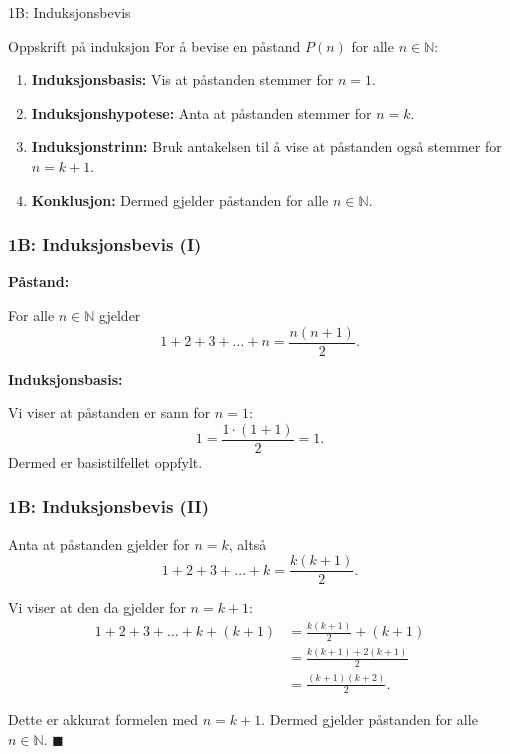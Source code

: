 \blueheader
\begin{frame}{1B: Induksjonsbevis}

\begin{blue*}{Oppskrift på induksjon}
For å bevise en påstand $P(n)$ for alle $n \in \mathbb{N}$:

\begin{enumerate}
    \item \textbf{Induksjonsbasis:} Vis at påstanden stemmer for $n=1$.
    \item \textbf{Induksjonshypotese:} Anta at påstanden stemmer for $n=k$.
    \item \textbf{Induksjonstrinn:} Bruk antakelsen til å vise at påstanden
          også stemmer for $n=k+1$.
    \item \textbf{Konklusjon:} Dermed gjelder påstanden for alle $n \in \mathbb{N}$.
\end{enumerate}

\end{blue*}

\end{frame}


\greenheader
\begin{frame}
\frametitle{1B: Induksjonsbevis (I)}

\textbf{Påstand:}

For alle $n \in \mathbb{N}$ gjelder
\[
1 + 2 + 3 + \dots + n = \frac{n(n+1)}{2}.
\]


\textbf{Induksjonsbasis:}

Vi viser at påstanden er sann for $n=1$:
\[
1 = \frac{1 \cdot (1+1)}{2} = 1.
\]
Dermed er basistilfellet oppfylt.


\end{frame}


\greenheader
\begin{frame}
\frametitle{1B: Induksjonsbevis (II)}

Anta at påstanden gjelder for $n=k$, altså
\[
1 + 2 + 3 + \dots + k = \frac{k(k+1)}{2}.
\]

Vi viser at den da gjelder for $n=k+1$:
\begin{align*}
1 + 2 + 3 + \dots + k + (k+1)
&= \frac{k(k+1)}{2} + (k+1) \\
&= \frac{k(k+1) + 2(k+1)}{2} \\
&= \frac{(k+1)(k+2)}{2}.
\end{align*}

Dette er akkurat formelen med $n=k+1$.  
Dermed gjelder påstanden for alle $n \in \mathbb{N}$. \hfill $\blacksquare$


\end{frame}



